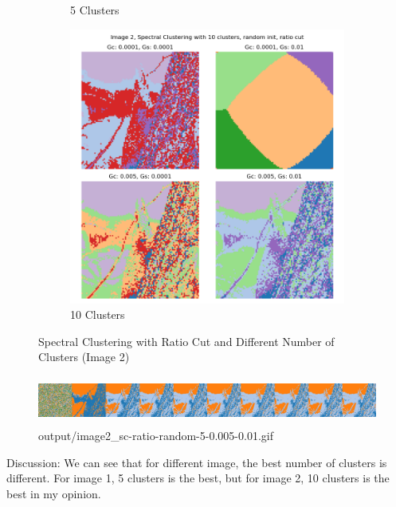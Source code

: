 \documentclass{homework}
\begin{document}
\begin{figure}[H]
\begin{subfigure}{0.32\textwidth}
        \caption{5 Clusters}
    \end{subfigure}
    \begin{subfigure}{0.32\textwidth}
        \centering
        \includegraphics[width=\textwidth]{output_grid/image2_sc-ratio-random-10.png}
        \caption{10 Clusters}
    \end{subfigure}
    \caption{Spectral Clustering with Ratio Cut and Different Number of Clusters (Image 2)}
\end{figure}

\begin{figure}[H]
    \centering
    \includegraphics[height=1.6cm]{output_flatgif/flatgif_image2_sc-ratio-random-5-0.005-0.01.png}
    \caption{output/image2\_sc-ratio-random-5-0.005-0.01.gif}
\end{figure}

Discussion: We can see that for different image, the best number of clusters is different. For image 1, 5 clusters is the best, but for image 2, 10 clusters is the best in my opinion.

\vspace{1em}
\end{document}
